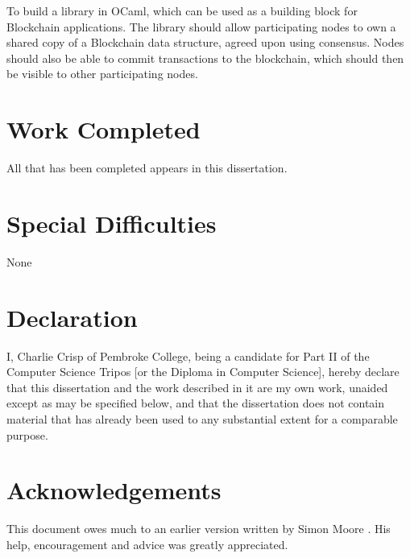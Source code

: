 \documentclass[12pt,a4paper,twoside,openright]{report}
\begin{document}
	To build a library in OCaml, which can be used as a building block for Blockchain applications. 
	The library should allow participating nodes to own a shared copy of a Blockchain data structure, agreed upon using consensus.
	Nodes should also be able to commit transactions to the blockchain, which should then be visible to other participating nodes. 
	
	
	\section*{Work Completed}
	
	All that has been completed appears in this dissertation.
	
	\section*{Special Difficulties}
	
	None
	 
	\newpage
	\section*{Declaration}
	
	I, Charlie Crisp of Pembroke College, being a candidate for Part II of the Computer
	Science Tripos [or the Diploma in Computer Science], hereby declare
	that this dissertation and the work described in it are my own work,
	unaided except as may be specified below, and that the dissertation
	does not contain material that has already been used to any substantial
	extent for a comparable purpose.
	
	\bigskip
	
	\medskip
	
	\tableofcontents
	
	\listoffigures
	
	\newpage
	\section*{Acknowledgements}
	
	This document owes much to an earlier version written by Simon Moore
	\cite{Moore95}.  His help, encouragement and advice was greatly 
	appreciated.
	
	
	\pagestyle{headings}
	
\end{document}
